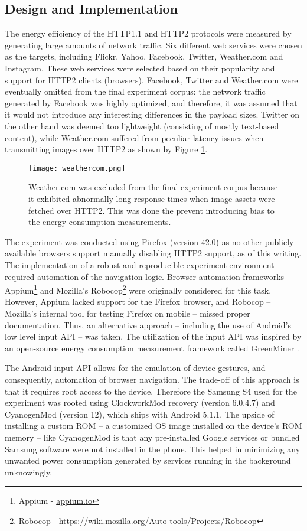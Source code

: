 \documentclass{article}
\begin{document}
\subsection{Design and Implementation}
\label{chapter:design-implementation}

The energy efficiency of the HTTP1.1 and HTTP2 protocols were measured by generating large amounts of network traffic. Six different web services were chosen as the targets, including Flickr, Yahoo, Facebook, Twitter, Weather.com and Instagram. These web services were selected based on their popularity and support for HTTP2 clients (browsers). Facebook, Twitter and Weather.com were eventually omitted from the final experiment corpus: the network traffic generated by Facebook was highly optimized, and therefore, it was assumed that it would not introduce any interesting differences in the payload sizes. Twitter on the other hand was deemed too lightweight (consisting of mostly text-based content), while Weather.com suffered from peculiar latency issues when transmitting images over HTTP2 as shown by Figure \ref{fig:weather.com}.

\begin{figure}[h!]
\centering
\texttt{[image: weathercom.png]}
\caption{Weather.com was excluded from the final experiment corpus because it exhibited abnormally long response times when image assets were fetched over HTTP2. This was done the prevent introducing bias to the energy consumption measurements.}
\label{fig:weather.com}
\end{figure}

The experiment was conducted using Firefox (version 42.0) as no other publicly available browsers support manually disabling HTTP2 support, as of this writing. The implementation of a robust and reproducible experiment environment required automation of the navigation logic. Browser automation frameworks Appium\footnote{Appium - \url{appium.io}} and Mozilla’s Robocop\footnote{Robocop - \url{https://wiki.mozilla.org/Auto-tools/Projects/Robocop}} were originally considered for this task. However, Appium lacked support for the Firefox browser, and Robocop -- Mozilla’s internal tool for testing Firefox on mobile -- missed proper documentation. Thus, an alternative approach -- including the use of Android’s low level input API -- was taken. The utilization of the input API was inspired by an open-source energy consumption measurement framework called GreenMiner \citep{greenminer}.

The Android input API allows for the emulation of device gestures, and consequently, automation of browser navigation. The trade-off of this approach is that it requires root access to the device. Therefore the Samsung S4 used for the experiment was rooted using ClockworkMod recovery (version 6.0.4.7) and CyanogenMod (version 12), which ships with Android 5.1.1. The upside of installing a custom ROM -- a customized OS image installed on the device's ROM memory -- like CyanogenMod is that any pre-installed Google services or bundled Samsung software were not installed in the phone. This helped in minimizing any unwanted power consumption generated by services running in the background unknowingly.
\end{document}

